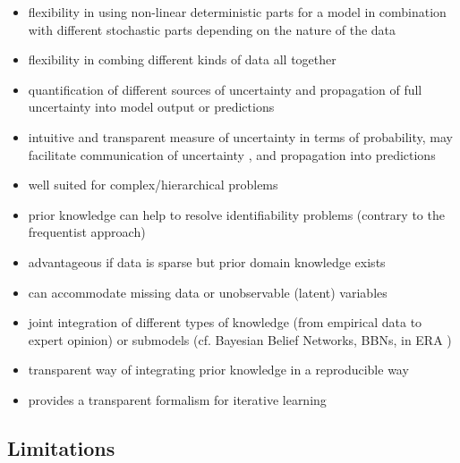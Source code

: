 \documentclass [english,11pt]{article} %
\begin{document}
\begin{itemize}
\item flexibility in using non-linear deterministic parts for a model in combination with different stochastic parts depending on the nature of the data
\item flexibility in combing different kinds of data all together
\item quantification of different sources of uncertainty and propagation of full uncertainty into model output or predictions
\item intuitive and transparent measure of uncertainty in terms of probability, may facilitate communication of uncertainty \citep{Ellison1996}, and propagation into predictions
\item well suited for complex/hierarchical problems \citep{Clark2005}
\item prior knowledge can help to resolve identifiability problems (contrary to the frequentist approach)  
\item advantageous if data is sparse but prior domain knowledge exists
\item can accommodate missing data or unobservable (latent) variables
\item joint integration of different types of knowledge (from empirical data to expert opinion) or submodels (cf. Bayesian Belief Networks, BBNs, in ERA \cite{Kaikkonen2021}) %
\item transparent way of integrating prior knowledge in a reproducible way
\item provides a transparent formalism for iterative learning
\end{itemize}


\subsection*{Limitations}
\end{document}
